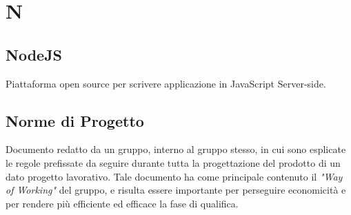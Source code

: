 \section*{N}

\subsection{NodeJS}
Piattaforma open source per scrivere applicazione in JavaScript Server-side.

\subsection{Norme di Progetto}
Documento redatto da un gruppo, interno al gruppo stesso, in cui sono esplicate le regole prefissate da seguire durante tutta la progettazione del prodotto di un dato progetto lavorativo. Tale documento ha come principale contenuto il \textit{"Way of Working"} del gruppo, e risulta essere importante per perseguire economicità e per rendere più efficiente ed efficace la fase di qualifica.
